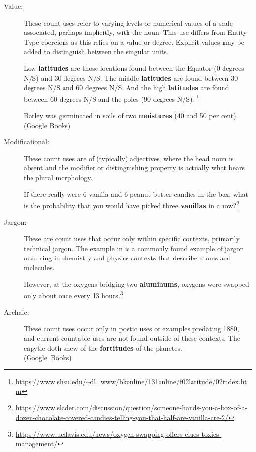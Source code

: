 \documentclass[output=paper]{langscibook}
\begin{document}
\begin{description}
\item[Value:] These count uses refer to varying levels or numerical values of a scale associated, perhaps implicitly, with the noun. This use differs from Entity Type coercions as this relies on a value or degree. Explicit values may be added to distinguish between the singular units.

\eanoraggedright \label{gri-ric:ex:latitudes} Low \textbf{latitudes} are those locations found between the Equator (0 degrees N/S) and 30 degrees N/S. The middle \textbf{latitudes} are found between 30 degrees N/S and 60 degrees N/S. And the high \textbf{latitudes} are found between 60 degrees N/S and the poles (90 degrees N/S). \footnote{\url{https://www.shsu.edu/~dl_www/bkonline/131online/f02latitude/02index.htm}} \z

\eanoraggedright \label{gri-ric:ex:moistures} Barley was germinated in soils of two \textbf{moistures} (40 and 50 per cent). \hfill (Google Books) \z


\item[Modificational:] These count uses are of (typically) adjectives, where the head noun is absent and the modifier or distinguishing property is actually what bears the plural morphology.

\eanoraggedright \label{gri-ric:ex:vanillas} If there really were 6 vanilla and 6 peanut butter candies in the box, what is the probability that you would have picked three \textbf{vanillas} in a row?\footnote{\url{https://www.slader.com/discussion/question/someone-hands-you-a-box-of-a-dozen-chocolate-covered-candies-telling-you-that-half-are-vanilla-cre-2/}} \z


\item[Jargon:] These are count uses that  occur only within specific contexts, primarily technical jargon. The example in  is a commonly found example of jargon occurring in chemistry and physics contexts that describe atoms and molecules.

\eanoraggedright \label{gri-ric:ex:oxygens}
However, at the oxygens bridging two \textbf{aluminums}, oxygens were swapped only about once every 13 hours.\footnote{\url{https://www.ucdavis.edu/news/oxygen-swapping-offers-clues-toxics-management/}}
\z 



\item[Archaic:] These count uses occur only in poetic uses or examples predating 1880, and current countable uses are not found outside of these contexts. 
\eanoraggedright 
The capytle doth shew of the \textbf{fortitudes} of the planetes.\\\hbox{}\hfill\hbox{(Google Books)}
\z



\end{description}
\end{document}
